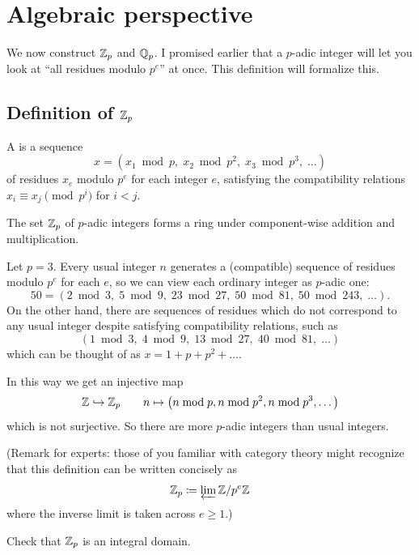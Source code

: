 \section{Algebraic perspective}
We now construct $\ZZ_p$ and $\mathbb Q_p$.
I promised earlier that a $p$-adic integer will let you look at
``all residues modulo $p^e$'' at once.
This definition will formalize this.

\subsection{Definition of $\ZZ_p$}
\begin{definition}
	[Introducing $\ZZ_p$]
	A  is a sequence
	\[ x = (x_1 \bmod p, \; x_2 \bmod{p^2}, \; x_3 \bmod{p^3}, \; \dots) \]
	of residues $x_e$ modulo $p^e$ for each integer $e$,
	satisfying the compatibility relations
	$x_i \equiv x_j \pmod{p^i}$ for $i < j$.

	The set $\ZZ_p$ of $p$-adic integers forms a ring
	under component-wise addition and multiplication.
\end{definition}

\begin{example}
	Let $p=3$.
	Every usual integer $n$ generates
	a (compatible) sequence of residues modulo $p^e$ for each $e$,
	so we can view each ordinary integer as $p$-adic one:
	\[ 50 = \left( 2 \bmod 3, \; 5 \bmod 9, \;
		23 \bmod{27}, \; 50 \bmod{81}, \; 50 \bmod{243}, \; \dots \right). \]
	On the other hand, there are sequences of residues
	which do not correspond to any usual integer despite
	satisfying compatibility relations, such as
	\[ \left( 1 \bmod 3, \; 4 \bmod 9, \;
		13 \bmod{27}, \; 40 \bmod{81}, \; \dots \right) \]
	which can be thought of as $x = 1 + p + p^2 + \dots$.
\end{example}
In this way we get an injective map
\[ \mathbb Z \hookrightarrow \mathbb Z_p \qquad
	n \mapsto \left( n \bmod p, n \bmod{p^2}, n \bmod{p^3}, \dots \right) \]
which is not surjective.
So there are more $p$-adic integers than usual integers.

(Remark for experts:
those of you familiar with category theory might recognize
that this definition can be written concisely as
\[ \mathbb Z_p \coloneqq \varprojlim \mathbb Z/p^e \mathbb Z \]
where the inverse limit is taken across $e \ge 1$.)

\begin{exercise}
	Check that $\ZZ_p$ is an integral domain.
\end{exercise}

